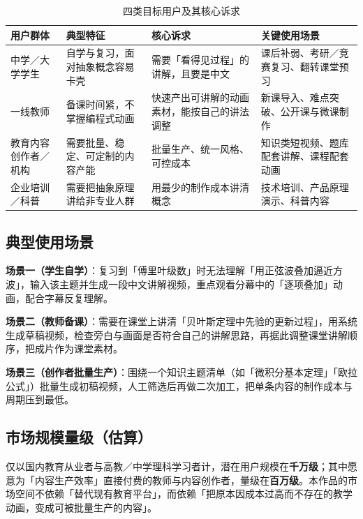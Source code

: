\documentclass[11pt,a4paper]{ctexart}
\begin{document}
\begin{table}[htbp]
\centering
\small
\caption{四类目标用户及其核心诉求}
\begin{tabularx}{\textwidth}{@{}p{2.5cm} p{3.3cm} p{4.2cm} X@{}}
\toprule
\textbf{用户群体} & \textbf{典型特征} & \textbf{核心诉求} & \textbf{关键使用场景} \\
\midrule
中学／大学学生 & 自学与复习，面对抽象概念容易卡壳 & 需要「看得见过程」的讲解，且要是中文 & 课后补弱、考研／竞赛复习、翻转课堂预习 \\
一线教师 & 备课时间紧，不掌握编程式动画 & 快速产出可讲解的动画素材，能按自己的讲法调整 & 新课导入、难点突破、公开课与微课制作 \\
教育内容创作者／机构 & 需要批量、稳定、可定制的内容产能 & 批量生产、统一风格、可控成本 & 知识类短视频、题库配套讲解、课程配套动画 \\
企业培训／科普 & 需要把抽象原理讲给非专业人群 & 用最少的制作成本讲清概念 & 技术培训、产品原理演示、科普内容 \\
\bottomrule
\end{tabularx}
\end{table}

\subsection{典型使用场景}

\textbf{场景一（学生自学）}：复习到「傅里叶级数」时无法理解「用正弦波叠加逼近方波」，输入该主题并生成一段中文讲解视频，重点观看分幕中的「逐项叠加」动画，配合字幕反复理解。

\textbf{场景二（教师备课）}：需要在课堂上讲清「贝叶斯定理中先验的更新过程」，用系统生成草稿视频，检查旁白与画面是否符合自己的讲解思路，再据此调整课堂讲解顺序，把成片作为课堂素材。

\textbf{场景三（创作者批量生产）}：围绕一个知识主题清单（如「微积分基本定理」「欧拉公式」）批量生成初稿视频，人工筛选后再做二次加工，把单条内容的制作成本与周期压到最低。

\subsection{市场规模量级（估算）}

仅以国内教育从业者与高教／中学理科学习者计，潜在用户规模在\textbf{千万级}；其中愿意为「内容生产效率」直接付费的教师与内容创作者，量级在\textbf{百万级}。本作品的市场空间不依赖「替代现有教育平台」，而依赖「把原本因成本过高而不存在的教学动画，变成可被批量生产的内容」。
\end{document}
